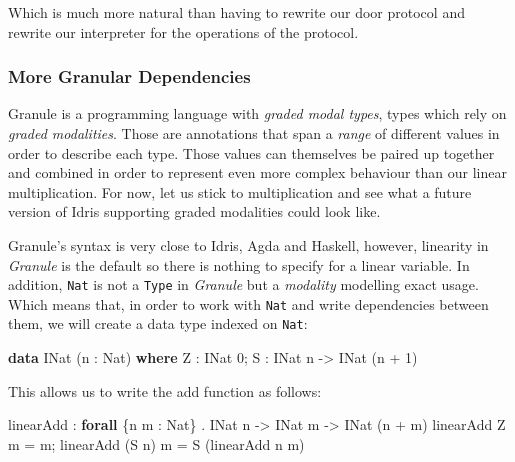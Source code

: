 \documentclass[
]{article}
\newenvironment{Shaded}{}{}
\newcommand{\DataTypeTok}[1]{\textcolor[rgb]{0.56,0.13,0.00}{#1}}
\newcommand{\DecValTok}[1]{\textcolor[rgb]{0.25,0.63,0.44}{#1}}
\newcommand{\KeywordTok}[1]{\textcolor[rgb]{0.00,0.44,0.13}{\textbf{#1}}}
\newcommand{\NormalTok}[1]{#1}
\newcommand{\OperatorTok}[1]{\textcolor[rgb]{0.40,0.40,0.40}{#1}}
\newcommand{\OtherTok}[1]{\textcolor[rgb]{0.00,0.44,0.13}{#1}}
\begin{document}
Which is much more natural than having to rewrite our door protocol and
rewrite our interpreter for the operations of the protocol.

\hypertarget{more-granular-dependencies}{%
\subsubsection{More Granular
Dependencies}\label{more-granular-dependencies}}

Granule is a programming language with \emph{graded modal types}, types
which rely on \emph{graded modalities}. Those are annotations that span
a \emph{range} of different values in order to describe each type. Those
values can themselves be paired up together and combined in order to
represent even more complex behaviour than our linear multiplication.
For now, let us stick to multiplication and see what a future version of
Idris supporting graded modalities could look like.

Granule's syntax is very close to Idris, Agda and Haskell, however,
linearity in \emph{Granule} is the default so there is nothing to
specify for a linear variable. In addition, \texttt{Nat} is not a
\texttt{Type} in \emph{Granule} but a \emph{modality} modelling exact
usage. Which means that, in order to work with \texttt{Nat} and write
dependencies between them, we will create a data type indexed on
\texttt{Nat}:

\begin{Shaded}
\begin{Highlighting}[]
\KeywordTok{data} \DataTypeTok{INat}\NormalTok{ (n }\OperatorTok{:} \DataTypeTok{Nat}\NormalTok{) }\KeywordTok{where}
  \DataTypeTok{Z} \OperatorTok{:} \DataTypeTok{INat} \DecValTok{0}\NormalTok{;}
  \DataTypeTok{S} \OperatorTok{:} \DataTypeTok{INat}\NormalTok{ n }\OtherTok{{-}\textgreater{}} \DataTypeTok{INat}\NormalTok{ (n }\OperatorTok{+} \DecValTok{1}\NormalTok{)}
\end{Highlighting}
\end{Shaded}

This allows us to write the add function as follows:

\begin{Shaded}
\begin{Highlighting}[]
\NormalTok{linearAdd }\OperatorTok{:} \KeywordTok{forall}\NormalTok{ \{n m }\OperatorTok{:} \DataTypeTok{Nat}\NormalTok{\} }\OperatorTok{.} \DataTypeTok{INat}\NormalTok{ n }\OtherTok{{-}\textgreater{}} \DataTypeTok{INat}\NormalTok{ m }\OtherTok{{-}\textgreater{}} \DataTypeTok{INat}\NormalTok{ (n }\OperatorTok{+}\NormalTok{ m)}
\NormalTok{linearAdd }\DataTypeTok{Z}\NormalTok{ m }\OtherTok{=}\NormalTok{ m;}
\NormalTok{linearAdd (}\DataTypeTok{S}\NormalTok{ n) m }\OtherTok{=} \DataTypeTok{S}\NormalTok{ (linearAdd n m)}
\end{Highlighting}
\end{Shaded}
\end{document}
